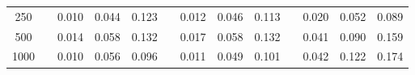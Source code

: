 % 
\begin{tabular}{ccccccccccccc}
  \hline
  \hline
250 &  & 0.010 & 0.044 & 0.123 &  & 0.012 & 0.046 & 0.113 &  & 0.020 & 0.052 & 0.089 \\ 
  500 &  & 0.014 & 0.058 & 0.132 &  & 0.017 & 0.058 & 0.132 &  & 0.041 & 0.090 & 0.159 \\ 
  1000 &  & 0.010 & 0.056 & 0.096 &  & 0.011 & 0.049 & 0.101 &  & 0.042 & 0.122 & 0.174 \\ 
   \hline
\end{tabular}

